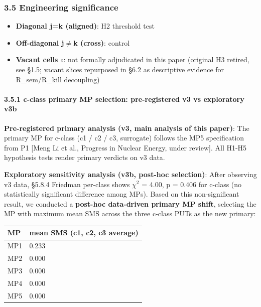 \documentclass[review,12pt,authoryear]{elsarticle}
\providecommand{\tightlist}{\setlength{\itemsep}{0pt}\setlength{\parskip}{0pt}}
\begin{document}
\subsubsection{3.5 Engineering
significance}\label{engineering-significance}

\begin{itemize}
\tightlist
\item
  \textbf{Diagonal j=k (aligned)}: H2 threshold test
\item
  \textbf{Off-diagonal j$\neq$k (cross)}: control
\item
  \textbf{Vacant cells $\circ$}: not formally adjudicated in this paper
  (original H3 retired, see §1.5; vacant slices repurposed in §6.2 as
  descriptive evidence for R\_sem/R\_kill decoupling)
\end{itemize}

\paragraph{3.5.1 c-class primary MP selection: pre-registered v3 vs
exploratory
v3b}\label{c-class-primary-mp-selection-pre-registered-v3-vs-exploratory-v3b}

\textbf{Pre-registered primary analysis (v3, main analysis of this
paper)}: The primary MP for c-class (c1 / c2 / c3, surrogate) follows
the MP5 specification from P1 {[}Meng Li et al., Progress in Nuclear
Energy, under review{]}. All H1-H5 hypothesis tests render primary
verdicts on v3 data.

\textbf{Exploratory sensitivity analysis (v3b, post-hoc selection)}:
After observing v3 data, §5.8.4 Friedman per-class shows $\chi$$^{2}$ = 4.00, p =
0.406 for c-class (no statistically significant difference among MPs).
Based on this non-significant result, we conducted a \textbf{post-hoc
data-driven primary MP shift}, selecting the MP with maximum mean SMS
across the three c-class PUTs as the new primary:

{\def\LTcaptype{none} %
\begin{longtable}[]{@{}ll@{}}
\toprule\noalign{}
MP & mean SMS (c1, c2, c3 average) \\
\midrule\noalign{}
\endhead
\bottomrule\noalign{}
\endlastfoot
MP1 & 0.233 \\
MP2 & 0.000 \\
MP3 & 0.000 \\
MP4 & 0.000 \\
MP5 & 0.000 \\
\end{longtable}
}
\end{document}
